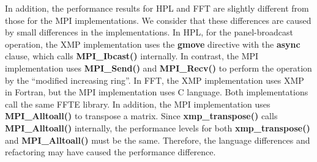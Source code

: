 \documentclass[graybox]{svmult}
\begin{document}
In addition,
the performance results for HPL and FFT are slightly different from those for the MPI implementations.
We consider that these differences are caused by small differences in the implementations.
In HPL, for the panel-broadcast operation,
the XMP implementation uses the {\bf gmove} directive with the {\bf async} clause, which calls {\bf MPI\_Ibcast()} internally.
In contrast,
the MPI implementation uses {\bf MPI\_Send()} and {\bf MPI\_Recv()} to perform the operation by the ``modified increasing ring''\cite{modified}.
In FFT, the XMP implementation uses XMP in Fortran, but the MPI implementation uses C language.
Both implementations call the same FFTE library.
In addition, the MPI implementation uses {\bf MPI\_Alltoall()} to transpose a matrix.
Since {\bf xmp\_transpose()} calls {\bf MPI\_Alltoall()} internally,
the performance levels for both {\bf xmp\_transpose()} and {\bf MPI\_Alltoall()} must be the same.
Therefore, the language differences and refactoring may have caused the performance difference.


\end{document}
